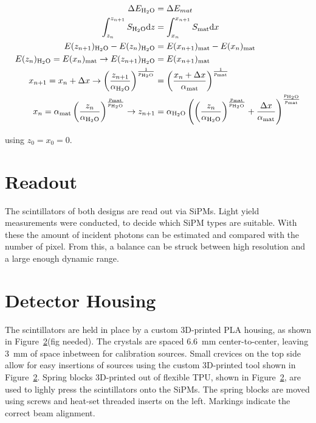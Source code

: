 \begin{align}
    \label{eq:detector:absorber:thickness}
    \Delta E_{\ce{H2O}} &= \Delta E_{mat} \\
    \int_{z_n}^{z_{n+1}} S_{\ce{H2O}}\text{d}z &= \int_{x_n}^{x_{n+1}} S_\text{mat}\text{d}x \\
    E(z_{n+1})_{\ce{H2O}}-E(z_n)_{\ce{H2O}}&= E(x_{n+1})_{\text{mat}}-E(x_n)_{\text{mat}}\\
    E(z_n)_{\ce{H2O}} = E(x_n)_{\text{mat}} \rightarrow E(z_{n+1})_{\ce{H2O}} &= E(x_{n+1})_{\text{mat}} \\
    x_{n+1} = x_n + \Delta x \rightarrow \left(\frac{z_{n+1}}{\alpha_{\ce{H2O}}}\right)^{\frac{1}{p_{\ce{H2O}}}} &= \left(\frac{x_{n}+\Delta x}{\alpha_{\text{mat}}}\right)^{\frac{1}{p_{\text{mat}}}} \\
    x_{n} = \alpha_{\text{mat}} \left(\frac{z_n}{\alpha_{\ce{H2O}}}\right)^{\frac{p_{\text{mat}}}{p_{\ce{H2O}}}} \rightarrow z_{n+1} &= \alpha_{\ce{H2O}} \left(\left(\frac{z_n}{\alpha_{\ce{H2O}}}\right)^{\frac{p_{\text{mat}}}{p_{\ce{H2O}}}} + \frac{\Delta x}{\alpha_{\text{mat}}}\right)^{\frac{p_{\ce{H2O}}}{p_{\text{mat}}}}
\end{align}

using $z_0 = x_0 = 0$.

\section{Readout}\label{section:readout}
The scintillators of both designs are read out via SiPMs.
Light yield measurements were conducted, to decide which SiPM types are suitable.
With these the amount of incident photons can be estimated and compared with the number of pixel.
From this, a balance can be struck between high resolution and a large enough dynamic range.

\section{Detector Housing}
The scintillators are held in place by a custom 3D-printed PLA housing, as shown in Figure~\ref{}(fig needed).
The crystals are spaced \SI{6.6}{\milli\meter} center-to-center, leaving \SI{3}{\milli\meter} of space inbetween for calibration sources.
Small crevices on the top side allow for easy insertions of sources using the custom 3D-printed tool shown in Figure~\ref{}.
Spring blocks 3D-printed out of flexible TPU, shown in Figure~\ref{}, are used to lighly press the scintillators onto the \glspl{SiPM}.
The spring blocks are moved using screws and heat-set threaded inserts on the left.
Markings indicate the correct beam alignment.


